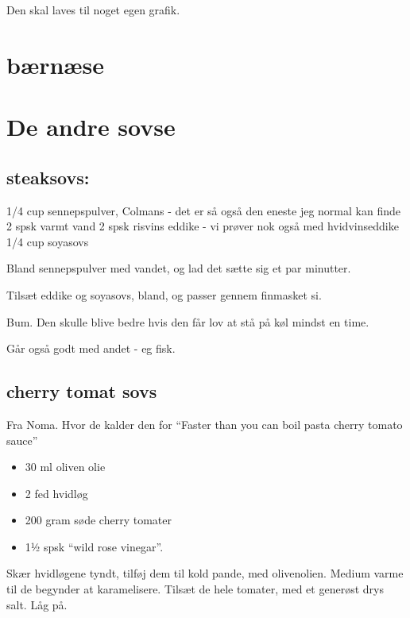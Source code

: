 \documentclass[
]{book}
\providecommand{\tightlist}{%
  \setlength{\itemsep}{0pt}\setlength{\parskip}{0pt}}
\begin{document}
Den skal laves til noget egen grafik.

\hypertarget{buxe6rnuxe6se}{%
\section{bærnæse}\label{buxe6rnuxe6se}}

\hypertarget{de-andre-sovse}{%
\section{De andre sovse}\label{de-andre-sovse}}

\hypertarget{steaksovs}{%
\subsection{steaksovs:}\label{steaksovs}}

1/4 cup sennepspulver, Colmans - det er så også den eneste jeg normal kan finde
2 spsk varmt vand
2 spsk risvins eddike - vi prøver nok også med hvidvinseddike
1/4 cup soyasovs

Bland sennepspulver med vandet, og lad det sætte sig et par minutter.

Tilsæt eddike og soyasovs, bland, og passer gennem finmasket si.

Bum. Den skulle blive bedre hvis den får lov at stå på køl mindst en time.

Går også godt med andet - eg fisk.

\hypertarget{cherry-tomat-sovs}{%
\subsection{cherry tomat sovs}\label{cherry-tomat-sovs}}

Fra Noma. Hvor de kalder den for ``Faster than you can boil pasta cherry tomato sauce''

\begin{itemize}
\tightlist
\item
  30 ml oliven olie
\item
  2 fed hvidløg
\item
  200 gram søde cherry tomater
\item
  1½ spsk ``wild rose vinegar''.
\end{itemize}

Skær hvidløgene tyndt, tilføj dem til kold pande, med olivenolien.
Medium varme til de begynder at karamelisere.
Tilsæt de hele tomater, med et generøst drys salt. Låg på.
\end{document}
